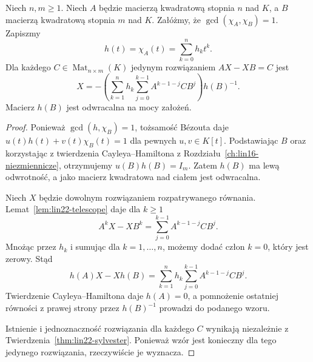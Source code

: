 \begin{twierdzenie}
\label{thm:lin22-explicit}
Niech \(n,m\ge1\).
Niech \(A\) będzie macierzą
kwadratową stopnia \(n\) nad \(K\),
a \(B\) macierzą kwadratową
stopnia \(m\) nad \(K\).
Załóżmy, że \(\gcd(\chi_A,\chi_B)=1\).
Zapiszmy
\[
 h(t)=\chi_A(t)=\sum_{k=0}^{n}h_kt^k.
\]
Dla każdego
\(C\in\operatorname{Mat}_{n\times m}(K)\)
jedynym rozwiązaniem
\(AX-XB=C\) jest
\[
 X=-\left(
 \sum_{k=1}^{n}h_k
 \sum_{j=0}^{k-1}
   A^{k-1-j}CB^j
 \right)h(B)^{-1}.
\]
Macierz \(h(B)\) jest odwracalna
na mocy założeń.
\end{twierdzenie}
\begin{proof}
Ponieważ \(\gcd(h,\chi_B)=1\),
tożsamość Bézouta daje
\(u(t)h(t)+v(t)\chi_B(t)=1\)
dla pewnych \(u,v\in K[t]\).
Podstawiając \(B\) oraz korzystając
z twierdzenia Cayleya--Hamiltona
z Rozdziału~\ref{ch:lin16-niezmiennicze},
otrzymujemy
\(u(B)h(B)=I_m\).
Zatem \(h(B)\) ma lewą odwrotność,
a jako macierz kwadratowa nad ciałem
jest odwracalna.

Niech \(X\) będzie dowolnym
rozwiązaniem rozpatrywanego równania.
Lemat~\ref{lem:lin22-telescope}
daje dla \(k\ge1\)
\[
 A^kX-XB^k
 =\sum_{j=0}^{k-1}A^{k-1-j}CB^j.
\]
Mnożąc przez \(h_k\)
i sumując dla \(k=1,\ldots,n\),
możemy dodać człon \(k=0\),
który jest zerowy.
Stąd
\[
 h(A)X-Xh(B)=
 \sum_{k=1}^{n}h_k
 \sum_{j=0}^{k-1}A^{k-1-j}CB^j.
\]
Twierdzenie Cayleya--Hamiltona
daje \(h(A)=0\),
a pomnożenie ostatniej równości
z prawej strony przez \(h(B)^{-1}\)
prowadzi do podanego wzoru.

Istnienie i jednoznaczność
rozwiązania dla każdego \(C\)
wynikają niezależnie z
Twierdzenia~\ref{thm:lin22-sylvester}.
Ponieważ wzór jest konieczny
dla tego jedynego rozwiązania,
rzeczywiście je wyznacza.
\end{proof}

